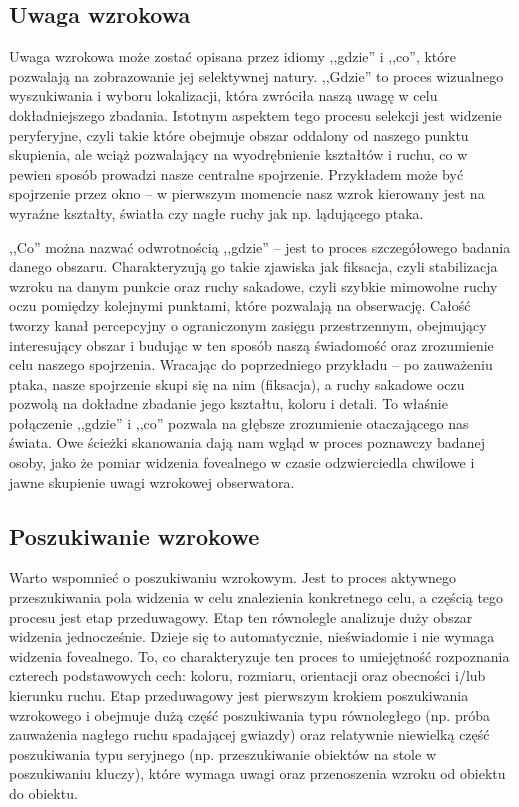 \documentclass[a4paper,twoside,12pt]{book}
\begin{document}
\subsection{Uwaga wzrokowa}
\label{subsec:uwaga-wzrokowa}

Uwaga wzrokowa może zostać opisana przez idiomy ,,gdzie'' i ,,co'', które pozwalają na zobrazowanie jej selektywnej natury. ,,Gdzie'' to proces wizualnego wyszukiwania i wyboru lokalizacji, która zwróciła naszą uwagę w celu dokładniejszego zbadania. Istotnym aspektem tego procesu selekcji jest widzenie peryferyjne, czyli takie które obejmuje obszar oddalony od naszego punktu skupienia, ale wciąż pozwalający na wyodrębnienie kształtów i ruchu, co w pewien sposób prowadzi nasze centralne spojrzenie. Przykładem może być spojrzenie przez okno -- w pierwszym momencie nasz wzrok kierowany jest na wyraźne kształty, światła czy nagłe ruchy jak np. lądującego ptaka. 

,,Co'' można nazwać odwrotnością ,,gdzie'' -- jest to proces szczegółowego badania danego obszaru. Charakteryzują go takie zjawiska jak fiksacja, czyli stabilizacja wzroku na danym punkcie oraz ruchy sakadowe, czyli szybkie mimowolne ruchy oczu pomiędzy kolejnymi punktami, które pozwalają na obserwację. Całość tworzy kanał percepcyjny o ograniczonym zasięgu przestrzennym, obejmujący interesujący obszar i budując w ten sposób naszą świadomość oraz zrozumienie celu naszego spojrzenia. Wracając do poprzedniego przykładu -- po zauważeniu ptaka, nasze spojrzenie skupi się na nim (fiksacja), a ruchy sakadowe oczu pozwolą na dokładne zbadanie jego kształtu, koloru i detali. To właśnie połączenie ,,gdzie'' i ,,co'' pozwala na głębsze zrozumienie otaczającego nas świata. Owe ścieżki skanowania dają nam 
wgląd w proces poznawczy badanej osoby, jako że pomiar widzenia fovealnego w czasie odzwierciedla chwilowe i jawne skupienie uwagi wzrokowej obserwatora. 

\subsection{Poszukiwanie wzrokowe}
\label{subsec:poszukiwanie-wzrokowe}

Warto wspomnieć o poszukiwaniu wzrokowym. Jest to proces aktywnego przeszukiwania pola widzenia w celu znalezienia konkretnego celu, a częścią tego procesu jest etap przeduwagowy. Etap ten równolegle analizuje duży obszar widzenia jednocześnie. Dzieje się to automatycznie, nieświadomie i nie wymaga widzenia fovealnego. To, co charakteryzuje ten proces to umiejętność rozpoznania czterech podstawowych cech: koloru, rozmiaru, orientacji oraz obecności i/lub kierunku ruchu. Etap przeduwagowy jest pierwszym krokiem poszukiwania wzrokowego i obejmuje dużą część poszukiwania typu równoległego (np. próba zauważenia nagłego ruchu spadającej gwiazdy) oraz relatywnie niewielką część poszukiwania typu seryjnego (np. przeszukiwanie obiektów na stole w poszukiwaniu kluczy), które wymaga uwagi oraz przenoszenia wzroku od obiektu do obiektu. 
\end{document}
